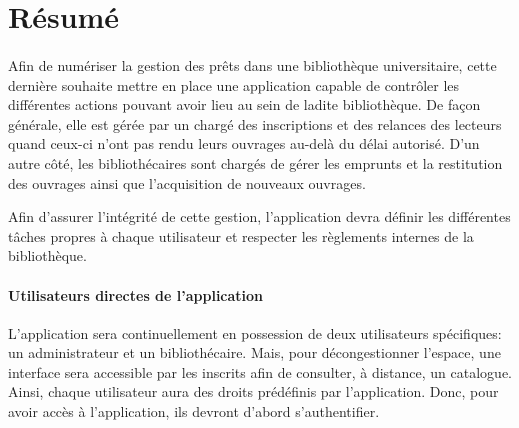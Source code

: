 \section*{Résumé}
\paragraph{}
Afin de numériser la gestion des prêts dans une bibliothèque 
universitaire, cette dernière souhaite mettre en place une 
application capable de contrôler les différentes actions
 pouvant avoir lieu au sein de ladite bibliothèque. 
 De façon générale, elle est gérée par un chargé des 
 inscriptions et des relances des lecteurs quand ceux-ci 
 n’ont pas rendu leurs ouvrages au-delà du délai autorisé. 
 D’un autre côté, les bibliothécaires sont chargés de gérer 
 les emprunts et la restitution des ouvrages ainsi que 
 l’acquisition de nouveaux ouvrages. \par
Afin d’assurer l’intégrité de cette gestion, l’application 
devra définir les différentes tâches propres à chaque 
utilisateur et respecter les règlements internes de la 
bibliothèque. \par

\paragraph{Utilisateurs directes de l’application}
\par 
L’application sera continuellement en possession de deux 
utilisateurs spécifiques: un administrateur et un 
bibliothécaire. Mais, pour décongestionner l’espace, 
une interface sera accessible par les inscrits afin de 
consulter, à distance, un catalogue. Ainsi, chaque utilisateur aura des droits prédéfinis par 
l’application. Donc, pour avoir accès à l’application, 
ils devront d’abord s’authentifier. \par

